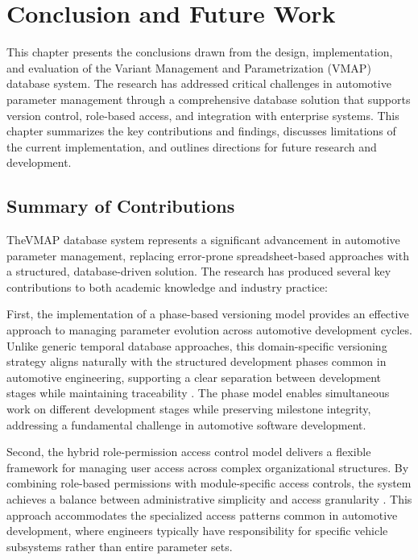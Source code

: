 \chapter{Conclusion and Future Work}
\label{chap:conclusion}

This chapter presents the conclusions drawn from the design, implementation, and evaluation of the Variant Management and Parametrization (VMAP) database system. The research has addressed critical challenges in automotive parameter management through a comprehensive database solution that supports version control, role-based access, and integration with enterprise systems. This chapter summarizes the key contributions and findings, discusses limitations of the current implementation, and outlines directions for future research and development.

\section{Summary of Contributions}
\label{sec:contributions-summary}

The\ac{VMAP} database system represents a significant advancement in automotive parameter management, replacing error-prone spreadsheet-based approaches with a structured, database-driven solution. The research has produced several key contributions to both academic knowledge and industry practice:

First, the implementation of a phase-based versioning model provides an effective approach to managing parameter evolution across automotive development cycles. Unlike generic temporal database approaches, this domain-specific versioning strategy aligns naturally with the structured development phases common in automotive engineering, supporting a clear separation between development stages while maintaining traceability \cite{broy2006challenges}. The phase model enables simultaneous work on different development stages while preserving milestone integrity, addressing a fundamental challenge in automotive software development.

Second, the hybrid role-permission access control model delivers a flexible framework for managing user access across complex organizational structures. By combining role-based permissions with module-specific access controls, the system achieves a balance between administrative simplicity and access granularity \cite{ferraiolo2011policy}. This approach accommodates the specialized access patterns common in automotive development, where engineers typically have responsibility for specific vehicle subsystems rather than entire parameter sets.

